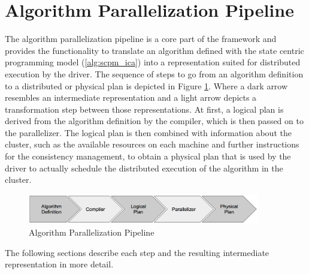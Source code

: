 \section{Algorithm Parallelization Pipeline}
\label{s:algo_parallel_pipeline}
The algorithm parallelization pipeline is a core part of the framework and provides the functionality to translate an algorithm defined with the state centric programming model (\ref{alg:scpm_ica}) into a representation suited for distributed execution by the driver.
The sequence of steps to go from an algorithm definition to a distributed or physical plan is depicted in Figure \ref{fig:parallel_pipeline}.
Where a dark arrow resembles an intermediate representation and a light arrow depicts a transformation step between those representations.
At first, a logical plan is derived from the algorithm definition by the compiler, which is then passed on to the parallelizer.
The logical plan is then combined with information about the cluster, such as the available resources on each machine and further instructions for the consistency management, to obtain a physical plan that is used by the driver to actually schedule the distributed execution of the algorithm in the cluster.
\begin{figure}[ht]
\centering
\includegraphics[width=0.9\textwidth]{img/algo_parallel_pipeline.png}
\caption{Algorithm Parallelization Pipeline}
\label{fig:parallel_pipeline}
\end{figure}
The following sections describe each step and the resulting intermediate representation in more detail.

